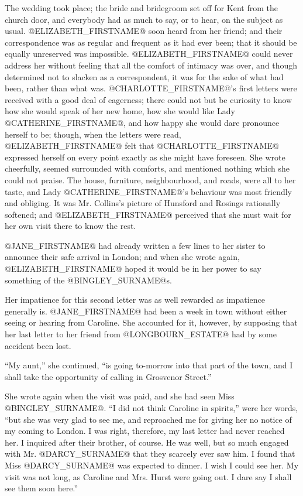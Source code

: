 The wedding took place; the bride and bridegroom set off for Kent from
the church door, and everybody had as much to say, or to hear, on
the subject as usual. @ELIZABETH_FIRSTNAME@ soon heard from her friend; and their
correspondence was as regular and frequent as it had ever been; that
it should be equally unreserved was impossible. @ELIZABETH_FIRSTNAME@ could never
address her without feeling that all the comfort of intimacy was over,
and though determined not to slacken as a correspondent, it was for the
sake of what had been, rather than what was. @CHARLOTTE_FIRSTNAME@'s first letters
were received with a good deal of eagerness; there could not but be
curiosity to know how she would speak of her new home, how she would
like Lady @CATHERINE_FIRSTNAME@, and how happy she would dare pronounce herself to
be; though, when the letters were read, @ELIZABETH_FIRSTNAME@ felt that @CHARLOTTE_FIRSTNAME@
expressed herself on every point exactly as she might have foreseen. She
wrote cheerfully, seemed surrounded with comforts, and mentioned nothing
which she could not praise. The house, furniture, neighbourhood, and
roads, were all to her taste, and Lady @CATHERINE_FIRSTNAME@'s behaviour was most
friendly and obliging. It was Mr. Collins's picture of Hunsford and
Rosings rationally softened; and @ELIZABETH_FIRSTNAME@ perceived that she must wait
for her own visit there to know the rest.

@JANE_FIRSTNAME@ had already written a few lines to her sister to announce their
safe arrival in London; and when she wrote again, @ELIZABETH_FIRSTNAME@ hoped it
would be in her power to say something of the @BINGLEY_SURNAME@s.

Her impatience for this second letter was as well rewarded as impatience
generally is. @JANE_FIRSTNAME@ had been a week in town without either seeing or
hearing from Caroline. She accounted for it, however, by supposing that
her last letter to her friend from @LONGBOURN_ESTATE@ had by some accident been
lost.

``My aunt,'' she continued, ``is going to-morrow into that part of the
town, and I shall take the opportunity of calling in Grosvenor Street.''

She wrote again when the visit was paid, and she had seen Miss @BINGLEY_SURNAME@.
``I did not think Caroline in spirits,'' were her words, ``but she was very
glad to see me, and reproached me for giving her no notice of my coming
to London. I was right, therefore, my last letter had never reached
her. I inquired after their brother, of course. He was well, but so much
engaged with Mr. @DARCY_SURNAME@ that they scarcely ever saw him. I found that
Miss @DARCY_SURNAME@ was expected to dinner. I wish I could see her. My visit was
not long, as Caroline and Mrs. Hurst were going out. I dare say I shall
see them soon here.''

